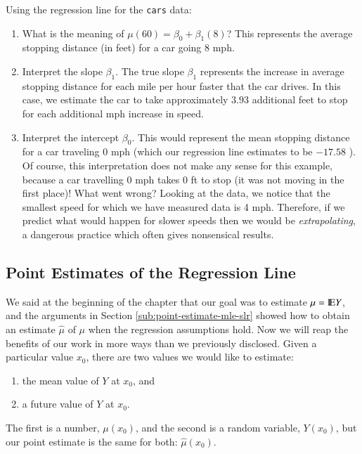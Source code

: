 \documentclass[captions=tableheading]{scrbook}
\begin{document}
\begin{example}
\label{exa:regline-cars-interpret}

Using the regression line for the \texttt{cars} data:

\begin{enumerate}
\item What is the meaning of \( \mu(60) = \beta_{0} + \beta_{1}(8) \)? 
   This represents the average stopping distance (in feet) for a car going 8 mph.
\item Interpret the slope \(\beta_{1}\). 
   The true slope \(\beta_{1}\) represents the increase in average stopping distance for each mile per hour faster that the car drives. In this case, we estimate the car to take approximately \(  3.93 \) additional feet to stop for each additional mph increase in speed.
\item Interpret the intercept \( \beta_{0} \).
   This would represent the mean stopping distance for a car traveling 0 mph (which our regression line estimates to be \(  -17.58 \) ). Of course, this interpretation does not make any sense for this example, because a car travelling 0 mph takes 0 ft to stop (it was not moving in the first place)! What went wrong? Looking at the data, we notice that the smallest speed for which we have measured data is 4 mph. Therefore, if we predict what would happen for slower speeds then we would be \emph{extrapolating}, a dangerous practice which often gives nonsensical results.
\end{enumerate}
\end{example}
\subsection{Point Estimates of the Regression Line}
\label{sec-1-2-2}

\label{sub:slr-point-est-regline}

We said at the beginning of the chapter that our goal was to estimate \( \mu = \mathrm{I\hspace{-1.5pt}E} Y \), and the arguments in Section \ref{sub:point-estimate-mle-slr} showed how to obtain an estimate \( \hat{\mu} \) of \( \mu \) when the regression assumptions hold. Now we will reap the benefits of our work in more ways than we previously disclosed. Given a particular value \(x_{0}\), there are two values we would like to estimate:
\begin{enumerate}
\item the mean value of \(Y\) at \(x_{0}\), and
\item a future value of \(Y\) at \(x_{0}\).
\end{enumerate}
The first is a number, \(\mu(x_{0})\), and the second is a random variable, \(Y(x_{0})\), but our point estimate is the same for both: \(\hat{\mu}(x_{0})\).
\end{document}
